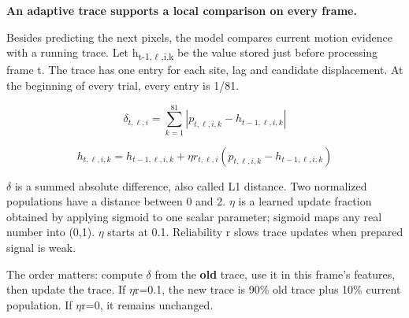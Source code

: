 \documentclass[11pt,letterpaper]{article}
\begin{document}
\textbf{An adaptive trace supports a local comparison on every frame.}


Besides predicting the next pixels, the model compares current motion evidence with a running trace. Let h\textsubscript{t-1,\(\ell\),i,k} be the value stored just before processing frame t. The trace has one entry for each site, lag and candidate displacement. At the beginning of every trial, every entry is 1/\allowbreak{}81.


\begin{equation}\delta_{t,\ell,i}=\sum_{k=1}^{81}|p_{t,\ell,i,k}-h_{t-1,\ell,i,k}|\end{equation}

\begin{equation}h_{t,\ell,i,k}=h_{t-1,\ell,i,k}+\eta r_{t,\ell,i}(p_{t,\ell,i,k}-h_{t-1,\ell,i,k})\end{equation}

\(\delta\) is a summed absolute difference, also called L1 distance. Two normalized populations have a distance between 0 and 2. \(\eta\) is a learned update fraction obtained by applying sigmoid to one scalar parameter; sigmoid maps any real number into (0,1). \(\eta\) starts at 0.1. Reliability r slows trace updates when prepared signal is weak.


The order matters: compute \(\delta\) from the \textbf{old} trace, use it in this frame's features, then update the trace. If \(\eta\)r=0.1, the new trace is 90\% old trace plus 10\% current population. If \(\eta\)r=0, it remains unchanged.


\begin{center}\end{center}
\end{document}
